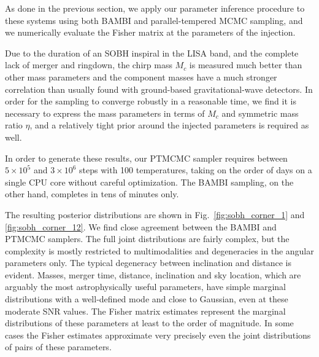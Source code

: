 \documentclass[aps,showpacs,twocolumn,prd,superscriptaddress,nofootinbib]{revtex4-1}
\newcommand{\Mchirp}{M_{c}}
\begin{document}
As done in the previous section, we apply our parameter inference procedure to
these systems using both BAMBI and parallel-tempered MCMC sampling, and we
numerically evaluate the Fisher matrix at the parameters of the injection.

Due to the duration of an SOBH inspiral in the LISA band, and the complete lack
of merger and ringdown, the chirp mass $\Mchirp$ is measured much better than
other mass parameters and the component masses have a much stronger correlation
than usually found with ground-based gravitational-wave detectors. In order for
the sampling to converge robustly in a reasonable time, we find it is necessary
to express the mass parameters in terms of $\Mchirp$ and symmetric mass ratio
$\eta$, and a relatively tight prior around the injected parameters is required
as well.

In order to generate these results, our PTMCMC sampler requires between
$5\times 10^5$ and $3\times 10^6$ steps with 100 temperatures, taking on the
order of days on a single CPU core without careful optimization. The BAMBI
sampling, on the other hand, completes in tens of minutes only.

The resulting posterior distributions are shown in Fig.~\ref{fig:sobh_corner_1}
and \ref{fig:sobh_corner_12}. We find close agreement between the BAMBI and
PTMCMC samplers. The full joint distributions are fairly complex, but the
complexity is mostly restricted to multimodalities and degeneracies in the
angular parameters only. The typical degeneracy between inclination and distance
is evident. Masses, merger time, distance, inclination and sky location, which
are arguably the most astrophysically useful parameters, have simple marginal
distributions with a well-defined mode and close to Gaussian, even at these
moderate SNR values. The Fisher matrix estimates represent the marginal
distributions of these parameters at least to the order of magnitude. In some
cases the Fisher estimates approximate very precisely even the joint
distributions of pairs of these parameters.
\end{document}
